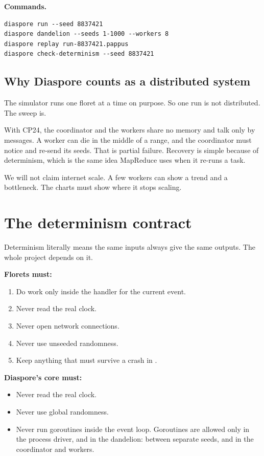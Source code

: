 \documentclass[12pt,letterpaper]{article}
\newcommand{\code}[1]{\texttt{\detokenize{#1}}}
\newcommand{\lbl}[1]{\textbf{#1}\enspace}
\begin{document}
\lbl{Commands.}

\begin{lstlisting}[style=cmd]
diaspore run --seed 8837421
diaspore dandelion --seeds 1-1000 --workers 8
diaspore replay run-8837421.pappus
diaspore check-determinism --seed 8837421
\end{lstlisting}

\subsection*{Why Diaspore counts as a distributed system}

The simulator runs one floret at a time on purpose. So one run is not distributed. The sweep is.

With CP24, the coordinator and the workers share no memory and talk only by messages. A worker can die in the middle of a range, and the coordinator must notice and re-send its seeds. That is partial failure. Recovery is simple because of determinism, which is the same idea MapReduce uses when it re-runs a task.

We will not claim internet scale. A few workers can show a trend and a bottleneck. The charts must show where it stops scaling.

\section{The determinism contract}

Determinism literally means the same inputs always give the same outputs. The whole project depends on it.

\lbl{Florets must:}

\begin{enumerate}
  \item Do work only inside the handler for the current event.
  \item Never read the real clock.
  \item Never open network connections.
  \item Never use unseeded randomness.
  \item Keep anything that must survive a crash in \code{store}.
\end{enumerate}

\lbl{Diaspore's core must:}

\begin{itemize}
  \item Never read the real clock.
  \item Never use global randomness.
  \item Never run goroutines inside the event loop. Goroutines are allowed only in the process driver, and in the dandelion: between separate seeds, and in the coordinator and workers.
\end{itemize}
\end{document}
